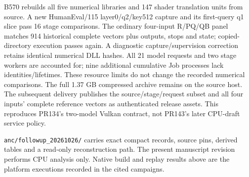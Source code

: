 B570 rebuilds all five numerical libraries and 147 shader translation units from source. A new HumanEval/115 layer0/q2/key512 capture and its first-query q1 slice pass 16 stage comparisons. The ordinary four-input R/PQ/QB panel matches 914 historical complete vectors plus outputs, stops and state; copied-directory execution passes again. A diagnostic capture/supervision correction retains identical numerical DLL hashes. All 21 model requests and two stage workers are accounted for; nine additional cumulative Job processes lack identities/lifetimes. These resource limits do not change the recorded numerical comparisons. The full 1.37 GB compressed archive remains on the source host. The subsequent delivery publishes the source/stage/request subset and all four inputs' complete reference vectors as authenticated release assets. This reproduces PR134's two-model Vulkan contract, not PR143's later CPU-draft service policy.

\texttt{anc/followup\_20261026/} carries exact compact records, source pins, derived tables and a read-only reconstruction path. The present manuscript revision performs CPU analysis only. Native build and replay results above are the platform executions recorded in the cited campaigns.
